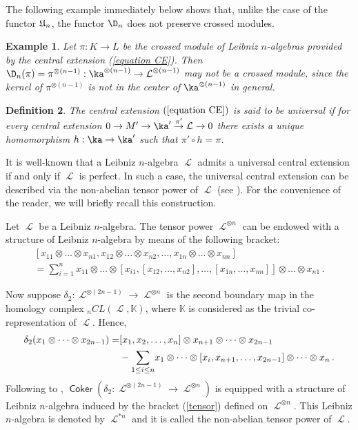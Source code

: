 \documentclass[12pt, reqno]{amsart}
\newtheorem{definition}{Definition}[section]
\newtheorem{example}[definition]{Example}
\def\U{\operatorname{\frak{U}}}
\def\ele{\operatorname{\mathcal{L}}}
\DeclareMathOperator{\Coker}{\mathsf {Coker}}
\begin{document}
The following example immediately below shows that, unlike the case of the functor $\U_n$, the functor $\D_n$ does not preserve crossed modules.

\begin{example}
 Let $\pi : K \to L$ be the crossed module of Leibniz $n$-algebras provided by the central extension (\ref{equation CE}). Then $\D_n(\pi)=\pi^{\otimes (n-1)}  : \ka^{\otimes (n-1)}  \to \ele^{\otimes (n-1)}$ may not be a crossed module, since the kernel of $\pi^{\otimes (n-1)}$ is not in the center of $\ka^{\otimes (n-1)}$ in general.
\end{example}


\begin{definition} \label{Def UCE}
The central extension $(\ref{equation CE})$ is said to be {\it universal} if for every central extension $ 0 \to M' \to {\ka}' \stackrel{\pi'} \to {\ele} \to 0$ there exists a unique homomorphism $h : {\ka} \to {\ka}'$ such that $\pi'\circ h = \pi$.
\end{definition}


It is well-known  that a Leibniz $n$-algebra ${\ele}$ admits a universal central
extension if and only if ${\ele}$ is perfect. In such a case, the universal central extension can be described via the non-abelian tensor power of $\ele$ (see \cite{Ca, Ca 1}). For the convenience of the reader, we will briefly recall this construction.

Let ${\ele}$ be a Leibniz $n$-algebra. The tensor power ${\ele}^{\otimes n}$ can be endowed with a structure of Leibniz $n$-algebra by means of the following bracket:
\begin{equation} \label{tensor}
\begin{array}{l} [x_{11} \otimes \dots \otimes x_{n1}, x_{12} \otimes \dots \otimes x_{n2}, \dots, x_{1n} \otimes \dots \otimes x_{nn}]  \\
= \displaystyle \sum_{i=1}^n x_{11} \otimes \dots \otimes [x_{i1}, [x_{12}, \dots, x_{n2}], \dots, [x_{1n}, \dots, x_{nn}]] \otimes \dots \otimes x_{n1} \, .
\end{array}
\end{equation}

Now suppose $\delta_2: {\ele}^{\otimes (2n-1)} \to {\ele}^{\otimes n}$ is the second boundary map in the homology complex $_nCL(\ele,\mathbb{K})$, where $\mathbb{K}$ is considered as the trivial co-representation of $\ele$. Hence,
\begin{align*}
\delta_2(x_{1} \otimes \dots \otimes x_{2n-1})=& [x_1, x_2, \dots, x_n]\otimes x_{n+1}\otimes \dots \otimes x_{2n-1}
\\
&-\underset{\scriptsize{1\leq i \leq n}}\sum x_1\otimes \dots \otimes [x_{i}, x_{n+1}, \dots, x_{2n-1}]\otimes \dots\otimes x_n \, .
\end{align*}
Following to \cite{Ca 1}, $\Coker(\delta_2: {\ele}^{\otimes (2n-1)} \to {\ele}^{\otimes n})$
is equipped with a structure of Leibniz $n$-algebra induced by the bracket (\ref{tensor}) defined on ${\ele}^{\otimes n}$.
This Leibniz $n$-algebra is denoted by ${\ele}^{\ast n}$  and it is called the non-abelian tensor power of $\ele$.
\end{document}
